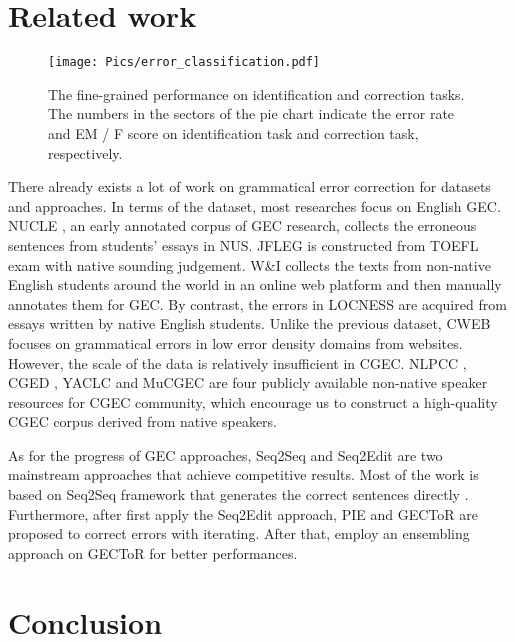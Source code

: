 \documentclass[11pt]{article}
\begin{document}
\section{Related work}

\begin{figure}[t]
	\centering
	\texttt{[image: Pics/error\_classification.pdf]} 
	\caption{The fine-grained performance on identification and correction tasks. The numbers in the sectors of the pie chart indicate the error rate and EM / F score on identification task and correction task, respectively.}
	\label{fig:error-classify}
\end{figure}
 
There already exists a lot of work on grammatical error correction for datasets and approaches. In terms of the dataset, most researches focus on English GEC. NUCLE \cite{dahlmeier2013building}, an early annotated corpus of GEC research, collects the erroneous sentences from students' essays in NUS. JFLEG \cite{napoles2017jfleg} is constructed from TOEFL exam with native sounding judgement. W\&I \cite{bryant2019bea} collects the texts from non-native English students around the world in an online web platform and then manually annotates them for GEC. By contrast, the errors in LOCNESS \cite{bryant2019bea} are acquired from essays written by native English students. Unlike the previous dataset, CWEB \cite{flachs2020grammatical} focuses on grammatical errors in low error density domains from websites. However, the scale of the data is relatively insufficient in CGEC. NLPCC \cite{zhao2018overview}, CGED \cite{rao2020overview}, YACLC \cite{wang2021yaclc} and MuCGEC \cite{zhang2022mucgec} are four publicly available non-native speaker resources for CGEC community, which encourage us to construct a high-quality CGEC corpus derived from native speakers.

As for the progress of GEC approaches, Seq2Seq and Seq2Edit are two mainstream approaches that achieve competitive results. Most of the work is based on Seq2Seq framework that generates the correct sentences directly \cite{zhou2019improving,wan2020improving,zhao2020maskgec,kaneko2020encoder}. Furthermore, after \citet{malmi2019encode} first apply the Seq2Edit approach, PIE \cite{awasthi2019parallel} and GECToR \cite{zhang2022mucgec} are proposed to correct errors with iterating. After that, \citet{tarnavskyi2022ensembling} employ an ensembling approach on GECToR for better performances.  
\section{Conclusion}
\end{document}
